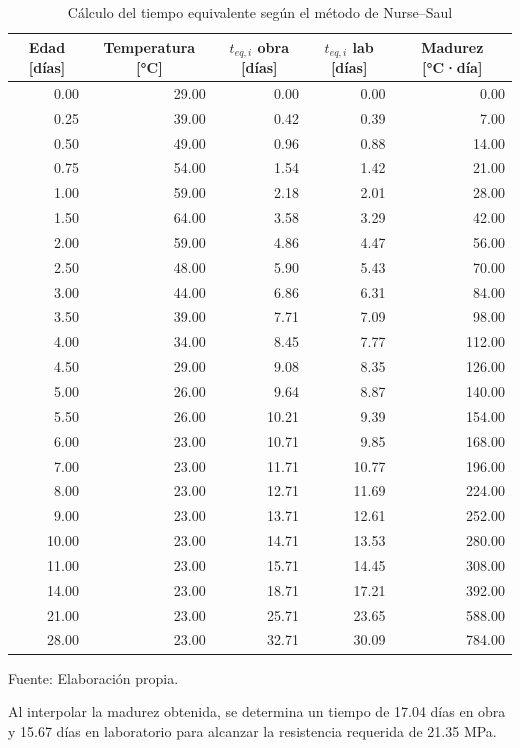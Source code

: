 \begin{table}[H]
\centering
\renewcommand{\arraystretch}{1.15}
\caption{Cálculo del tiempo equivalente según el método de Nurse–Saul}
\begin{tabular}{r r r r r}
\hline
\multicolumn{1}{c}{Edad [días]} & \multicolumn{1}{c}{Temperatura [°C]} & \multicolumn{1}{c}{$t_{eq,i}$ obra [días]} & \multicolumn{1}{c}{$t_{eq,i}$ lab [días]} & \multicolumn{1}{c}{Madurez [°C·día]} \\
\hline
0.00 & 29.00 & 0.00 & 0.00 & 0.00 \\
0.25 & 39.00 & 0.42 & 0.39 & 7.00 \\
0.50 & 49.00 & 0.96 & 0.88 & 14.00 \\
0.75 & 54.00 & 1.54 & 1.42 & 21.00 \\
1.00 & 59.00 & 2.18 & 2.01 & 28.00 \\
1.50 & 64.00 & 3.58 & 3.29 & 42.00 \\
2.00 & 59.00 & 4.86 & 4.47 & 56.00 \\
2.50 & 48.00 & 5.90 & 5.43 & 70.00 \\
3.00 & 44.00 & 6.86 & 6.31 & 84.00 \\
3.50 & 39.00 & 7.71 & 7.09 & 98.00 \\
4.00 & 34.00 & 8.45 & 7.77 & 112.00 \\
4.50 & 29.00 & 9.08 & 8.35 & 126.00 \\
5.00 & 26.00 & 9.64 & 8.87 & 140.00 \\
5.50 & 26.00 & 10.21 & 9.39 & 154.00 \\
6.00 & 23.00 & 10.71 & 9.85 & 168.00 \\
7.00 & 23.00 & 11.71 & 10.77 & 196.00 \\
8.00 & 23.00 & 12.71 & 11.69 & 224.00 \\
9.00 & 23.00 & 13.71 & 12.61 & 252.00 \\
10.00 & 23.00 & 14.71 & 13.53 & 280.00 \\
11.00 & 23.00 & 15.71 & 14.45 & 308.00 \\
14.00 & 23.00 & 18.71 & 17.21 & 392.00 \\
21.00 & 23.00 & 25.71 & 23.65 & 588.00 \\
28.00 & 23.00 & 32.71 & 30.09 & 784.00 \\
\hline
\end{tabular}

Fuente: Elaboración propia.

\end{table}

Al interpolar la madurez obtenida, se determina un tiempo de 17.04 días en obra y 15.67 días en laboratorio para alcanzar la resistencia requerida de 21.35 MPa.



